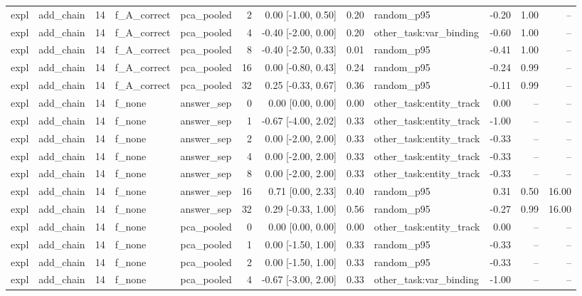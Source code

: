 \begin{tabular}{llrllrrrlrrr}
expl & add\_chain & 14 & f\_A\_correct & pca\_pooled & 2 & 0.00 [-1.00, 0.50] & 0.20 & random\_p95 & -0.20 & 1.00 & -- \\
expl & add\_chain & 14 & f\_A\_correct & pca\_pooled & 4 & -0.40 [-2.00, 0.00] & 0.20 & other\_task:var\_binding & -0.60 & 1.00 & -- \\
expl & add\_chain & 14 & f\_A\_correct & pca\_pooled & 8 & -0.40 [-2.50, 0.33] & 0.01 & random\_p95 & -0.41 & 1.00 & -- \\
expl & add\_chain & 14 & f\_A\_correct & pca\_pooled & 16 & 0.00 [-0.80, 0.43] & 0.24 & random\_p95 & -0.24 & 0.99 & -- \\
expl & add\_chain & 14 & f\_A\_correct & pca\_pooled & 32 & 0.25 [-0.33, 0.67] & 0.36 & random\_p95 & -0.11 & 0.99 & -- \\
expl & add\_chain & 14 & f\_none & answer\_sep & 0 & 0.00 [0.00, 0.00] & 0.00 & other\_task:entity\_track & 0.00 & -- & -- \\
expl & add\_chain & 14 & f\_none & answer\_sep & 1 & -0.67 [-4.00, 2.02] & 0.33 & other\_task:entity\_track & -1.00 & -- & -- \\
expl & add\_chain & 14 & f\_none & answer\_sep & 2 & 0.00 [-2.00, 2.00] & 0.33 & other\_task:entity\_track & -0.33 & -- & -- \\
expl & add\_chain & 14 & f\_none & answer\_sep & 4 & 0.00 [-2.00, 2.00] & 0.33 & other\_task:entity\_track & -0.33 & -- & -- \\
expl & add\_chain & 14 & f\_none & answer\_sep & 8 & 0.00 [-2.00, 2.00] & 0.33 & other\_task:entity\_track & -0.33 & -- & -- \\
expl & add\_chain & 14 & f\_none & answer\_sep & 16 & 0.71 [0.00, 2.33] & 0.40 & random\_p95 & 0.31 & 0.50 & 16.00 \\
expl & add\_chain & 14 & f\_none & answer\_sep & 32 & 0.29 [-0.33, 1.00] & 0.56 & random\_p95 & -0.27 & 0.99 & 16.00 \\
expl & add\_chain & 14 & f\_none & pca\_pooled & 0 & 0.00 [0.00, 0.00] & 0.00 & other\_task:entity\_track & 0.00 & -- & -- \\
expl & add\_chain & 14 & f\_none & pca\_pooled & 1 & 0.00 [-1.50, 1.00] & 0.33 & random\_p95 & -0.33 & -- & -- \\
expl & add\_chain & 14 & f\_none & pca\_pooled & 2 & 0.00 [-1.50, 1.00] & 0.33 & random\_p95 & -0.33 & -- & -- \\
expl & add\_chain & 14 & f\_none & pca\_pooled & 4 & -0.67 [-3.00, 2.00] & 0.33 & other\_task:var\_binding & -1.00 & -- & -- \\

\end{tabular}
